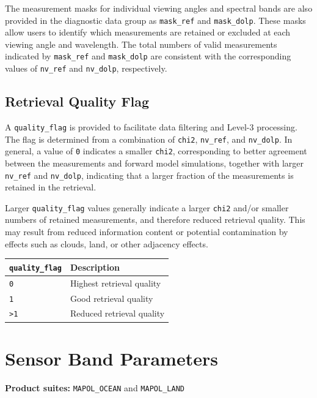 \documentclass[
  11pt,
  letterpaper,
]{scrreprt}
\begin{document}
The measurement masks for individual viewing angles and spectral bands
are also provided in the diagnostic data group as \texttt{mask\_ref} and
\texttt{mask\_dolp}. These masks allow users to identify which
measurements are retained or excluded at each viewing angle and
wavelength. The total numbers of valid measurements indicated by
\texttt{mask\_ref} and \texttt{mask\_dolp} are consistent with the
corresponding values of \texttt{nv\_ref} and \texttt{nv\_dolp},
respectively.

\subsection{Retrieval Quality Flag}\label{retrieval-quality-flag}

A \texttt{quality\_flag} is provided to facilitate data filtering and
Level-3 processing. The flag is determined from a combination of
\texttt{chi2}, \texttt{nv\_ref}, and \texttt{nv\_dolp}. In general, a
value of \texttt{0} indicates a smaller \texttt{chi2}, corresponding to
better agreement between the measurements and forward model simulations,
together with larger \texttt{nv\_ref} and \texttt{nv\_dolp}, indicating
that a larger fraction of the measurements is retained in the retrieval.

Larger \texttt{quality\_flag} values generally indicate a larger
\texttt{chi2} and/or smaller numbers of retained measurements, and
therefore reduced retrieval quality. This may result from reduced
information content or potential contamination by effects such as
clouds, land, or other adjacency effects.

\begin{longtable}[]{@{}ll@{}}
\toprule\noalign{}
\texttt{quality\_flag} & Description \\
\midrule\noalign{}
\endhead
\bottomrule\noalign{}
\endlastfoot
\texttt{0} & Highest retrieval quality \\
\texttt{1} & Good retrieval quality \\
\texttt{\textgreater{}1} & Reduced retrieval quality \\
\end{longtable}

\section{Sensor Band Parameters}\label{sensor-band-parameters}

\textbf{Product suites:} \texttt{MAPOL\_OCEAN} and \texttt{MAPOL\_LAND}
\end{document}
